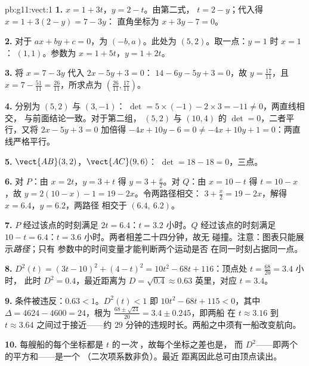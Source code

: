 \begin{solution}{pb:g11:vect:1}
\textbf{1.} $x = 1 + 3t$，$y = 2 - t$。由第二式，
$t = 2 - y$；代入得 $x = 1 + 3(2 - y) = 7 - 3y$：
直角坐标为 $x + 3y - 7 = 0$。

\textbf{2.} 对于 $ax + by + c = 0$，为
$(-b, a)$。此处为 $(5, 2)$。取一点：$y = 1$ 时 $x = 1$：
$(1, 1)$。参数为 $x = 1 + 5t$，$y = 1 + 2t$。

\textbf{3.} 将 $x = 7 - 3y$ 代入 $2x - 5y + 3 = 0$：
$14 - 6y - 5y + 3 = 0$，故 $y = \frac{17}{11}$，且
$x = 7 - \frac{51}{11} = \frac{26}{11}$，所求点为
$\left(\frac{26}{11}, \frac{17}{11}\right)$。

\textbf{4.} 分别为 $(5, 2)$ 与 $(3, -1)$：
$\det = 5 \times (-1) - 2 \times 3 = -11 \neq 0$，两直线相交，
与前面结论一致。对于第二组， $(5, 2)$ 与
$(10, 4)$ 的 $\det = 0$，二者平行，又将
$2x - 5y + 3 = 0$ 加倍得 $-4x + 10y - 6 = 0 \neq -4x + 10y + 1
= 0$：两直线严格平行。

\textbf{5.} $\vect{AB}(3, 2)$，$\vect{AC}(9, 6)$：
$\det = 18 - 18 = 0$，三点。

\textbf{6.} 对 $P$：由 $x = 2t$，$y = 3 + t$ 得 $y = 3 +
\frac x2$。对 $Q$：由 $x = 10 - t$ 得 $t = 10 - x$，故
$y = 2(10 - x) - 1 = 19 - 2x$。令两路径相交：
$3 + \frac x2 = 19 - 2x$，解得 $x = 6.4$，$y = 6.2$，两路径
相交于 $(6.4,\ 6.2)$。

\textbf{7.} $P$ 经过该点的时刻满足 $2t = 6.4$：$t = 3.2$ 小时。$Q$
经过该点的时刻满足 $10 - t = 6.4$：$t = 3.6$ 小时。两者相差二十四分钟，故无
碰撞。注意：图表只能展示\emph{路径}；只有
参数中的时间变量才能判断两个运动是否
在同一时刻占据同一点。

\textbf{8.} $D^2(t) = (3t - 10)^2 + (4 - t)^2 =
10t^2 - 68t + 116$：顶点处 $t = \frac{68}{20} = 3.4$ 小时，
此时 $D^2 = 0.4$，最近距离为
$D = \sqrt{0.4} \approx 0.63$ 英里，对应 $t = 3.4$。

\textbf{9.} 条件被违反：$0.63 < 1$。$D^2(t) < 1$ 即
$10t^2 - 68t + 115 < 0$，其中 $\Delta = 4624 - 4600 = 24$，根为
$\frac{68 \pm \sqrt{24}}{20} = 3.4 \pm 0.245$，即两船
在 $t \approx 3.16$ 到 $t \approx 3.64$ 之间过于接近——约
$29$ 分钟的违规时长。两船之中须有一船改变航向。

\textbf{10.} 每艘船的每个坐标都是 $t$ 的\emph{一次}
，故每个坐标之差也是，
而 $D^2$——即两个的平方和——是一个
（二次项系数非负）。最近
距离因此总可由顶点读出。


\end{solution}
